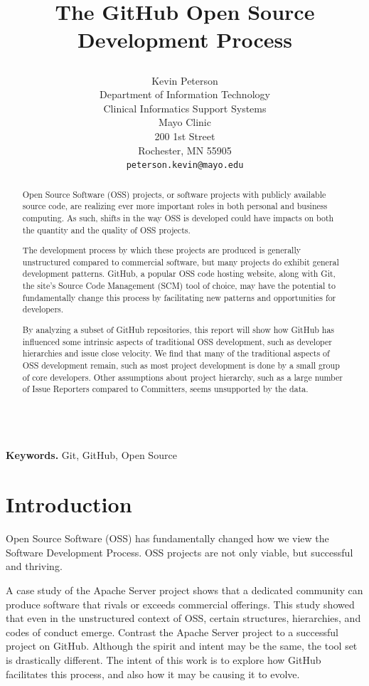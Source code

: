 \documentclass{proc}
\title{
The GitHub Open Source Development Process
\author{Kevin Peterson\\
Department of Information Technology\\
Clinical Informatics Support Systems\\
Mayo Clinic\\
200 1st Street\\
Rochester, MN  55905\\
\small \texttt{peterson.kevin@mayo.edu}
}
}
\begin{document}
\maketitle

\begin{abstract}
Open Source Software (OSS) projects, or software projects with publicly available source code, are realizing ever more important roles in both personal and business computing. As such, shifts in the way OSS is developed could have impacts on both the quantity and the quality of OSS projects.

The development process by which these projects are produced is generally unstructured compared to commercial software, but many projects do exhibit general development patterns. GitHub, a popular OSS code hosting website, along with Git, the site's Source Code Management (SCM) tool of choice, may have the potential to fundamentally change this process by facilitating new patterns and opportunities for developers.

By analyzing a subset of GitHub repositories, this report will show how GitHub has influenced some intrinsic aspects of traditional OSS development, such as developer hierarchies and issue close velocity. We find that many of the traditional aspects of OSS development remain, such as most project development is done by a small group of core developers. Other assumptions about project hierarchy, such as a large number of Issue Reporters compared to Committers, seems unsupported by the data.
\end{abstract}

\noindent \\\textbf{Keywords.} Git, GitHub, Open Source

\section{Introduction}
Open Source Software (OSS) has fundamentally changed how we view the Software Development Process\cite{raymond1999cathedral}. OSS projects are not only viable, but successful and thriving. 

A case study of the Apache Server project\cite{mockus2000case} shows that a dedicated community can produce software that rivals or exceeds commercial offerings. This study showed that even in the unstructured context of OSS, certain structures, hierarchies, and codes of conduct emerge. Contrast the Apache Server project to a successful project on GitHub. Although the spirit and intent may be the same, the tool set is drastically different. The intent of this work is to explore how GitHub facilitates this process, and also how it may be causing it to evolve.
\end{document}
